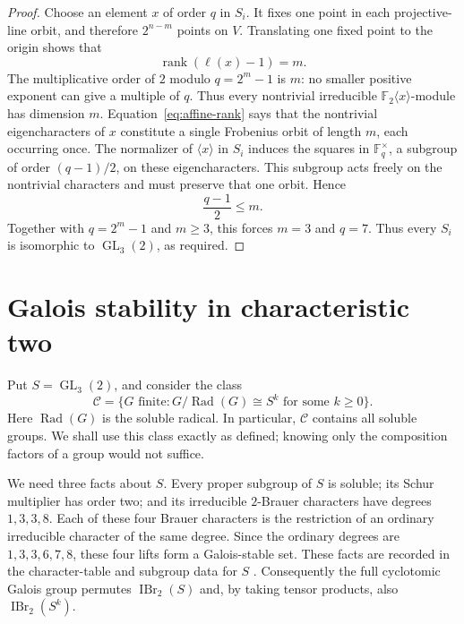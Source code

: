 \documentclass[11pt,a4paper]{amsart}
\theoremstyle{remark}
\numberwithin{equation}{section}
\begin{document}
\begin{proof}
Choose an element $x$ of order $q$ in $S_i$. It fixes one point in each
projective-line orbit, and therefore $2^{n-m}$ points on $V$. Translating
one fixed point to the origin shows that
\begin{equation}\label{eq:affine-rank}
 \operatorname{rank}(\ell(x)-1)=m.
\end{equation}
The multiplicative order of $2$ modulo $q=2^m-1$ is $m$: no smaller
positive exponent can give a multiple of $q$. Thus every nontrivial
irreducible $\mathbb F_2\langle x\rangle$-module has dimension $m$.
Equation~\eqref{eq:affine-rank} says that the nontrivial eigencharacters
of $x$ constitute a single Frobenius orbit of length $m$, each occurring
once. The normalizer of $\langle x\rangle$ in $S_i$ induces the squares
in $\mathbb F_q^{\times}$, a subgroup of order $(q-1)/2$, on these
eigencharacters. This subgroup acts freely on the nontrivial characters
and must preserve that one orbit. Hence
\[
 \frac{q-1}{2}\leq m.
\]
Together with $q=2^m-1$ and $m\geq3$, this forces $m=3$ and $q=7$.
Thus every $S_i$ is isomorphic to $\operatorname{GL}_3(2)$, as required.
\end{proof}



\section{Galois stability in characteristic two}
\label{sec:galois-stability}

Put $S=\operatorname{GL}_3(2)$, and consider the class
\[
\mathcal C=\bigl\{G\text{ finite}:G/\operatorname{Rad}(G)\cong S^k
                         \text{ for some }k\geq0\bigr\}.
\]
Here $\operatorname{Rad}(G)$ is the soluble radical. In particular,
$\mathcal C$ contains all soluble groups. We shall use this class exactly as
defined; knowing only the composition factors of a group would not suffice.

We need three facts about $S$. Every proper subgroup of $S$ is soluble;
its Schur multiplier has order two; and its irreducible $2$-Brauer characters
have degrees $1,3,3,8$. Each of these four Brauer characters is the restriction
of an ordinary irreducible character of the same degree. Since the ordinary
degrees are $1,3,3,6,7,8$, these four lifts form a Galois-stable set.
These facts are recorded in the character-table and subgroup data for $S$
\cite{GAP}. Consequently the full cyclotomic Galois group permutes
$\operatorname{IBr}_2(S)$ and, by taking tensor products, also
$\operatorname{IBr}_2(S^k)$.
\end{document}
